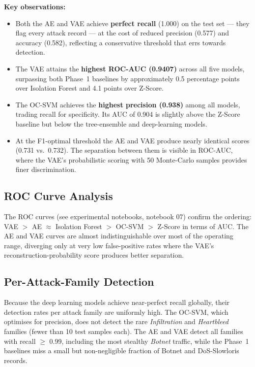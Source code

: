 \documentclass[conference]{IEEEtran}
\begin{document}
\textbf{Key observations:}
\begin{itemize}
  \item Both the AE and VAE achieve \textbf{perfect recall} (1.000) on the test
    set --- they flag every attack record --- at the cost of reduced precision
    (0.577) and accuracy (0.582), reflecting a conservative threshold that
    errs towards detection.
  \item The VAE attains the \textbf{highest ROC-AUC (0.9407)} across all five
    models, surpassing both Phase~1 baselines by approximately 0.5 percentage
    points over Isolation Forest and 4.1 points over Z-Score.
  \item The OC-SVM achieves the \textbf{highest precision (0.938)} among all
    models, trading recall for specificity. Its AUC of 0.904 is slightly above
    the Z-Score baseline but below the tree-ensemble and deep-learning models.
  \item At the F1-optimal threshold the AE and VAE produce nearly identical
    scores (0.731 vs.\ 0.732). The separation between them is visible in
    ROC-AUC, where the VAE's probabilistic scoring with 50 Monte-Carlo samples
    provides finer discrimination.
\end{itemize}

\subsection{ROC Curve Analysis}

The ROC curves (see experimental notebooks, notebook 07) confirm the
ordering: VAE $>$ AE $\approx$ Isolation Forest $>$ OC-SVM $>$ Z-Score
in terms of AUC. The AE and VAE curves are almost indistinguishable over most
of the operating range, diverging only at very low false-positive rates where
the VAE's reconstruction-probability score produces better separation.

\subsection{Per-Attack-Family Detection}

Because the deep learning models achieve near-perfect recall globally, their
detection rates per attack family are uniformly high. The OC-SVM, which
optimises for precision, does not detect the rare \textit{Infiltration} and
\textit{Heartbleed} families (fewer than 10 test samples each). The AE and VAE
detect all families with recall $\geq$ 0.99, including the most stealthy
\textit{Botnet} traffic, while the Phase~1 baselines miss a small but
non-negligible fraction of Botnet and DoS-Slowloris records.
\end{document}
